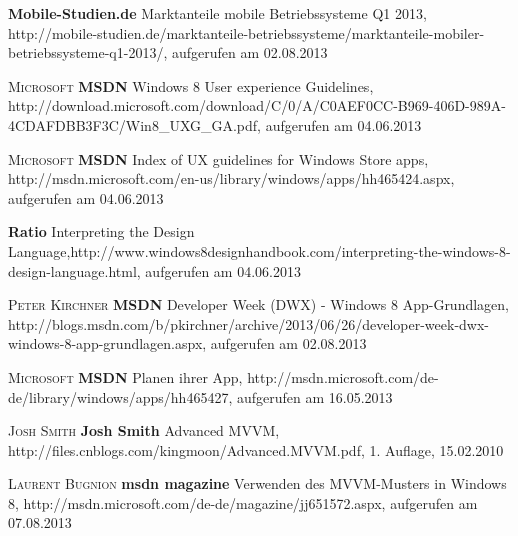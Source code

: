 \begin{thebibliography}{---}
              \textbf{Mobile-Studien.de}
              Marktanteile mobile Betriebssysteme Q1 2013, http://mobile-studien.de/marktanteile-betriebssysteme/marktanteile-mobiler-betriebssysteme-q1-2013/, aufgerufen am 02.08.2013
 
            \textsc{Microsoft}
           \textbf{MSDN}
           Windows 8 User experience Guidelines, http://download.microsoft.com/download/C/0/A/C0AEF0CC-B969-406D-989A-4CDAFDBB3F3C/Win8\_UXG\_GA.pdf, aufgerufen am 04.06.2013
                        
           \textsc{Microsoft}
          \textbf{MSDN}
          Index of UX guidelines for Windows Store apps, http://msdn.microsoft.com/en-us/library/windows/apps/hh465424.aspx, aufgerufen am 04.06.2013
          
           \textbf{Ratio}
          Interpreting the Design Language,http://www.windows8designhandbook.com/interpreting-the-windows-8-design-language.html, aufgerufen am 04.06.2013
           
            \textsc{Peter Kirchner}
           \textbf{MSDN}
           Developer Week (DWX) - Windows 8 App-Grundlagen, http://blogs.msdn.com/b/pkirchner/archive/2013/06/26/developer-week-dwx-windows-8-app-grundlagen.aspx, aufgerufen am 02.08.2013
  
                \textsc{Microsoft}
               \textbf{MSDN}
 			Planen ihrer App, http://msdn.microsoft.com/de-de/library/windows/apps/hh465427, aufgerufen am 16.05.2013

  		\textsc{Josh Smith}
  		\textbf{Josh Smith}
  Advanced MVVM, http://files.cnblogs.com/kingmoon/Advanced.MVVM.pdf, 1. Auflage, 15.02.2010 
    
                  \textsc{Laurent Bugnion}
                 \textbf{msdn magazine}
   			Verwenden des MVVM-Musters in Windows 8, http://msdn.microsoft.com/de-de/magazine/jj651572.aspx, aufgerufen am 07.08.2013
 
\end{thebibliography}

